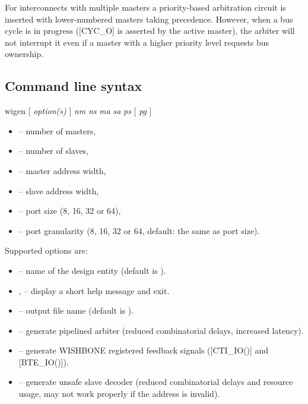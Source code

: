 \documentclass[a4paper,12pt,twoside,extrafontsizes]{memoir}
\begin{document}
For interconnects with multiple masters a priority-based arbitration circuit is inserted with lower-numbered masters taking precedence. However, when a bus cycle is in progress ([CYC\_O] is asserted by the active master), the arbiter will not interrupt it even if a master with a higher priority level requests bus ownership.

\subsection{Command line syntax}

\begin{codepar}
	wigen [ \emph{option(s)} ] \emph{nm} \emph{ns} \emph{ma} \emph{sa} \emph{ps} [ \emph{pg} ]
\end{codepar}

\begin{itemize}
	\item{} -- number of masters,
	\item{} -- number of slaves,
	\item{} -- master address width,
	\item{} -- slave address width,
	\item{} -- port size (8, 16, 32 or 64),
	\item{} -- port granularity (8, 16, 32 or 64, default: the same as port size).
\end{itemize}

Supported options are:

\begin{itemize}
	\item {} -- name of the design entity (default is ).
	
	\item {},  -- display a short help message and exit.
	
	\item {} -- output file name (default is ).
	
	\item {} -- generate pipelined arbiter (reduced combinatorial delays, increased latency).
	
	\item {} -- generate WISHBONE registered feedback signals ([CTI\_IO()] and [BTE\_IO()]).
	
	\item {} -- generate unsafe slave decoder (reduced combinatorial delays and resource usage, may not work properly if the address is invalid).
\end{itemize}
\end{document}
